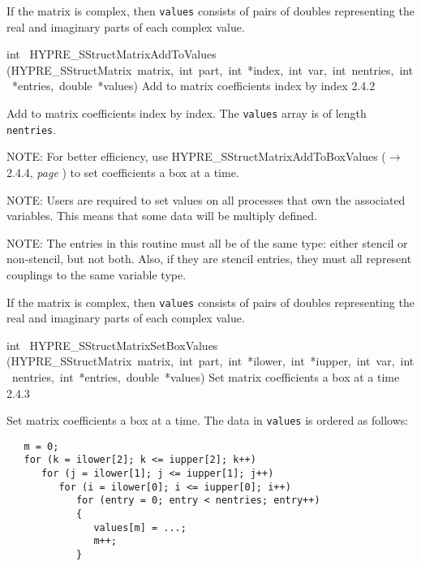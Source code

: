 \documentclass{article}
\begin{document}
\begin{cxxentry}
\begin{cxxentry}
\begin{cxxfunction}
\begin{cxxdoc}
If the matrix is complex, then {\tt values} consists of pairs of doubles
representing the real and imaginary parts of each complex value.


\end{cxxdoc}
\end{cxxfunction}
\begin{cxxfunction}
{int\ }
        {HYPRE\_SStructMatrixAddToValues}
        {(HYPRE\_SStructMatrix\ matrix,\ int\ part,\ int\ *index,\ int\ var,\ int\ nentries,\ int\ *entries,\ double\ *values)}
        {
Add to matrix coefficients index by index}
        {2.4.2}
\begin{cxxdoc}

Add to matrix coefficients index by index.  The {\tt values} array is of
length {\tt nentries}.

NOTE: For better efficiency, use HYPRE\_SStructMatrixAddToBoxValues ($\rightarrow$2.4.4, {\em page \pageref{cxx.2.4.4}}) to
set coefficients a box at a time.

NOTE: Users are required to set values on all processes that own the
associated variables.  This means that some data will be multiply defined.

NOTE: The entries in this routine must all be of the same type: either
stencil or non-stencil, but not both.  Also, if they are stencil entries,
they must all represent couplings to the same variable type.

If the matrix is complex, then {\tt values} consists of pairs of doubles
representing the real and imaginary parts of each complex value.


\end{cxxdoc}
\end{cxxfunction}
\begin{cxxfunction}
{int\ }
        {HYPRE\_SStructMatrixSetBoxValues}
        {(HYPRE\_SStructMatrix\ matrix,\ int\ part,\ int\ *ilower,\ int\ *iupper,\ int\ var,\ int\ nentries,\ int\ *entries,\ double\ *values)}
        {
Set matrix coefficients a box at a time}
        {2.4.3}
\begin{cxxdoc}

Set matrix coefficients a box at a time.  The data in {\tt values} is ordered
as follows:

\begin{verbatim}
   m = 0;
   for (k = ilower[2]; k <= iupper[2]; k++)
      for (j = ilower[1]; j <= iupper[1]; j++)
         for (i = ilower[0]; i <= iupper[0]; i++)
            for (entry = 0; entry < nentries; entry++)
            {
               values[m] = ...;
               m++;
            }
   \end{verbatim}


\end{cxxdoc}
\end{cxxfunction}
\end{cxxentry}
\end{cxxentry}
\end{document}
